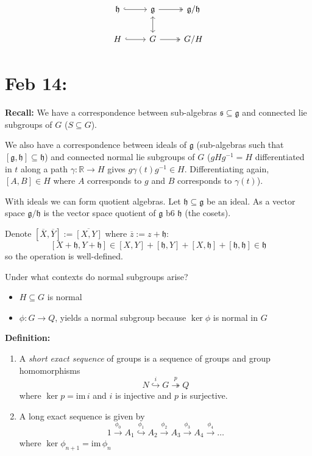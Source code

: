 \documentclass[12pt]{article}
\newcommand{\R}{\mathbb{R}}
\newcommand{\g}{\mathfrak{g}}
\renewcommand{\sf}{\mathfrak{s}}
\newcommand{\h}{\mathfrak{h}}
\newcommand{\im}{\text{im}\,}
\begin{document}
    \[\begin{tikzcd}
       \h \arrow[hook]{r} & \g \arrow[leftrightarrow]{d} \arrow[two heads]{r} & \g/\h\\ 
       H \arrow[hook]{r} & G \arrow[two heads]{r} & G/H
    \end{tikzcd}\]

\section{Feb 14:} 
    \textbf{Recall:} We have a correspondence between sub-algebras $\sf \subseteq \g$ and connected lie subgroups of $G$ ($S \subseteq G$). 

    We also have a correspondence between ideals of $\g$ (sub-algebras such that $[\g, \h] \subseteq \h$) and connected normal lie subgroups of $G$ ($gHg^{-1} = H$ differentiated in $t$ along a path $\gamma: \R \to H$ gives $g\gamma(t)g^{-1} \in H$. Differentiating again, $[A, B] \in H$ where $A$ corresponds to $g$ and $B$ corresponds to $\gamma(t)$).

    With ideals we can form quotient algebras. Let $\h \subseteq \g$ be an ideal. As a vector space $\g/\h$ is the vector space quotient of $\g$ b6 $\h$ (the cosets). 

    Denote $[\overline X, \overline Y] := \overline{[X, Y]}$ where $\overline z := z + \h$: 
    \[[X + \h, Y + \h] \in [X, Y] + [\h, Y] + [X, \h] + [\h, \h] \in \h\]
    so the operation is well-defined.

    Under what contexts do normal subgroups arise? 
    \begin{itemize}
        \item $H \subseteq G$ is normal 
        \item $\phi: G \to Q$, yields a normal subgroup because $\ker \phi$ is normal in $G$
    \end{itemize}

    \textbf{Definition:} 
    \begin{enumerate}
        \item A \emph{short exact sequence} of groups is a sequence of groups and group homomorphisms
        \[N \overset{i}{\hookrightarrow} G \overset{p}{\twoheadrightarrow} Q\]
        where $\ker p = \im i$ and $i$ is injective and $p$ is surjective.

        \item A long exact sequence is given by 
        \[1 \overset{\phi_0}{\longrightarrow} A_1 \overset{\phi_1}{\hookrightarrow} A_2 \overset{\phi_2}{\longrightarrow} A_3 \overset{\phi_3}{\longrightarrow} A_4 \overset{\phi_4}{\longrightarrow} \dots\]
        where $\ker \phi_{n+1} = \im \phi_n$ 
    \end{enumerate}
\end{document}
